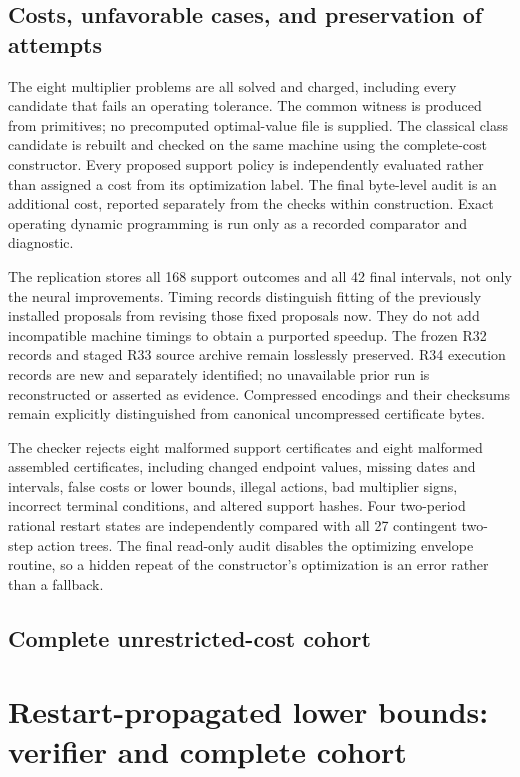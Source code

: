 \subsection{Costs, unfavorable cases, and preservation of attempts}
The eight multiplier problems are all solved and charged, including every candidate that fails an operating tolerance. The common witness is produced from primitives; no precomputed optimal-value file is supplied. The classical class candidate is rebuilt and checked on the same machine using the complete-cost constructor. Every proposed support policy is independently evaluated rather than assigned a cost from its optimization label. The final byte-level audit is an additional cost, reported separately from the checks within construction. Exact operating dynamic programming is run only as a recorded comparator and diagnostic.

The replication stores all 168 support outcomes and all 42 final intervals, not only the neural improvements. Timing records distinguish fitting of the previously installed proposals from revising those fixed proposals now. They do not add incompatible machine timings to obtain a purported speedup. The frozen R32 records and staged R33 source archive remain losslessly preserved. R34 execution records are new and separately identified; no unavailable prior run is reconstructed or asserted as evidence. Compressed encodings and their checksums remain explicitly distinguished from canonical uncompressed certificate bytes.

The checker rejects eight malformed support certificates and eight malformed assembled certificates, including changed endpoint values, missing dates and intervals, false costs or lower bounds, illegal actions, bad multiplier signs, incorrect terminal conditions, and altered support hashes. Four two-period rational restart states are independently compared with all 27 contingent two-step action trees. The final read-only audit disables the optimizing envelope routine, so a hidden repeat of the constructor's optimization is an error rather than a fallback.

\subsection{Complete unrestricted-cost cohort}


\section{Restart-propagated lower bounds: verifier and complete cohort}\label{app:restart}
